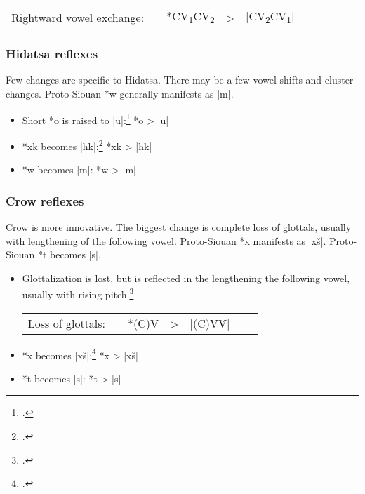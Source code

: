 \documentclass[output=paper]{LSP/langsci}
\begin{document}
\begin{itemize}


\begin{tabular}[t]{c c c c c c c}
Rightward vowel exchange:	 & & *CV\textsubscript{1}CV\textsubscript{2} & > & |CV\textsubscript{2}CV\textsubscript{1}|	
\end{tabular}
\end{itemize}

\subsubsection{Hidatsa reflexes}

Few changes are specific to Hidatsa.  There may be a few vowel shifts and cluster changes.  Proto-Siouan *w generally manifests as |m|.

\begin{itemize}
\item Short *o is raised to |u|:\footnote{\citealt[137, 922]{Rankinetal2006PDF}.}	 \hspace{1em} *o	>	|u|
\item *xk becomes |hk|:\footnote{\citealt[193]{Rankinetal2006PDF}.} \hspace{3.2em}  *xk	>	|hk|
\item *w becomes |m|: \hspace{4.1em} *w	>	|m|
\end{itemize}

\subsubsection{Crow reflexes}

Crow is more innovative.  The biggest change is complete loss of glottals, usually with lengthening of the following vowel.  Proto-Siouan *x manifests as |xš|.  Proto-Siouan *t becomes |s|.

\begin{itemize}
\item Glottalization is lost, but is reflected in the lengthening the following vowel, usually with rising pitch.\footnote{\citealt[232]{Rankinetal2006PDF}.}



\begin{tabular}[t]{c c c c c c c}
Loss of glottals:	 & & *(C)\textsuperscript{\textipa{P}}V & > & |(C)V\'V|
\end{tabular}

\item *x becomes |xš|:\footnote{	\citealt[124]{Rankinetal2006PDF}.}	\hspace{1em} *x	>	|xš|
\item *t becomes |s|: \hspace{2em}  *t	>	|s|
\end{itemize}
\end{document}
